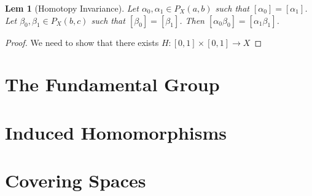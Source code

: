 \documentclass[paper=a4, fontsize=11pt]{scrartcl}
\newtheorem{lemma}{Lem}
\begin{document}
\begin{lemma}[Homotopy Invariance]
	Let $\alpha_0,\alpha_1 \in P_X(a,b)$ such that $[\alpha_0]=[\alpha_1]$. Let $\beta_0,\beta_1 \in P_X(b,c)$ such that $[\beta_0]=[\beta_1]$. Then $[\alpha_0\beta_0]=[\alpha_1\beta_1]$.\\
\end{lemma}

\begin{proof}
	We need to show that there exists $H:[0,1]\times[0,1]\to X$
\end{proof}

\section{The Fundamental Group}

\section{Induced Homomorphisms}

\section{Covering Spaces}
\end{document}
